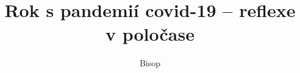 \documentclass{book}
\begin{document}
\title{Rok s pandemií covid-19 -- reflexe v poločase}
\author{Bisop}
\maketitle


%




























 


\tableofcontents
\end{document}
